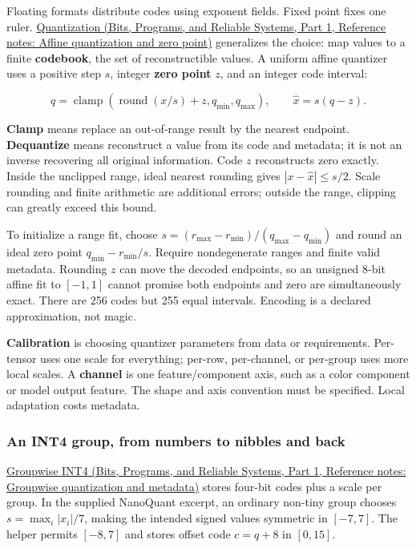 Floating formats distribute codes using exponent fields. Fixed point fixes one ruler. \href{../01-Bits-Programs-and-Reliable-Systems-P01/main.pdf\#appendix-d5da3eaabaef}{Quantization (Bits, Programs, and Reliable Systems, Part 1, Reference notes: Affine quantization and zero point)} generalizes the choice: map values to a finite \textbf{codebook}, the set of reconstructible values. A uniform affine quantizer uses a positive step \(s\), integer \textbf{zero point} \(z\), and an integer code interval:

\[
q=\operatorname{clamp}\!\left(\operatorname{round}(x/s)+z,q_{\min},q_{\max}\right),
\qquad
\widehat x=s(q-z).
\]

\textbf{Clamp} means replace an out-of-range result by the nearest endpoint. \textbf{Dequantize} means reconstruct a value from its code and metadata; it is not an inverse recovering all original information. Code \(z\) reconstructs zero exactly. Inside the unclipped range, ideal nearest rounding gives \(|x-\widehat x|\le s/2\). Scale rounding and finite arithmetic are additional errors; outside the range, clipping can greatly exceed this bound.

To initialize a range fit, choose \(s=(r_{\max}-r_{\min})/(q_{\max}-q_{\min})\) and round an ideal zero point \(q_{\min}-r_{\min}/s\). Require nondegenerate ranges and finite valid metadata. Rounding \(z\) can move the decoded endpoints, so an unsigned 8-bit affine fit to \([-1,1]\) cannot promise both endpoints and zero are simultaneously exact. There are 256 codes but 255 equal intervals. Encoding is a declared approximation, not magic.

\textbf{Calibration} is choosing quantizer parameters from data or requirements. Per-tensor uses one scale for everything; per-row, per-channel, or per-group uses more local scales. A \textbf{channel} is one feature/component axis, such as a color component or model output feature. The shape and axis convention must be specified. Local adaptation costs metadata.

\subsubsection{An INT4 group, from numbers to nibbles and back}\label{05-engine-i-ch001-an-int4-group-from-numbers-to-nibbles-and-back}

\hypertarget{05-engine-i-ch001-an-int4-group-from-numbers-to-nibbles-and-back}{}

\href{../01-Bits-Programs-and-Reliable-Systems-P01/main.pdf\#appendix-638204c40e8b}{Groupwise INT4 (Bits, Programs, and Reliable Systems, Part 1, Reference notes: Groupwise quantization and metadata)} stores four-bit codes plus a scale per group. In the supplied NanoQuant excerpt, an ordinary non-tiny group chooses \(s=\max_i|x_i|/7\), making the intended signed values symmetric in \([-7,7]\). The helper permits \([-8,7]\) and stores offset code \(c=q+8\) in \([0,15]\).


